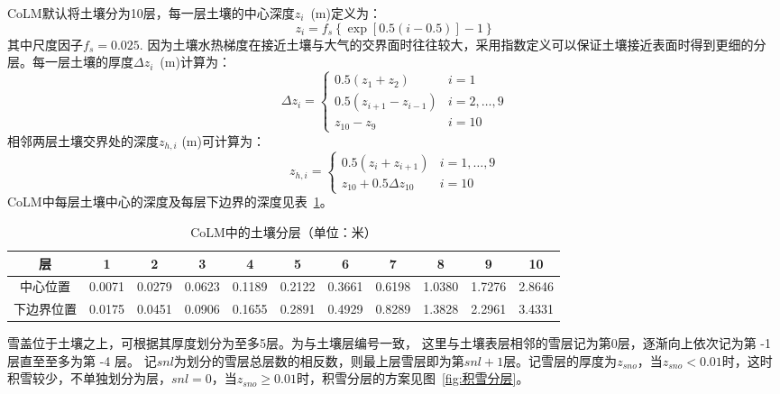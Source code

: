 CoLM默认将土壤分为10层，每一层土壤的中心深度$z_i$~(m)定义为：
\begin{equation}
z_{i} = f_{s}\left\{ \exp{\left\lbrack 0.5(i - 0.5) \right\rbrack} - 1 \right\}
\end{equation}
其中尺度因子$f_s=0.025$. 因为土壤水热梯度在接近土壤与大气的交界面时往往较大，采用指数定义可以保证土壤接近表面时得到更细的分层。每一层土壤的厚度$\Delta z_i$~(m)计算为：
\begin{equation}
\Delta z_{i}=\left\{\begin{array}{ll}0.5\left(z_{1}+z_{2}\right) & i=1 \\
0.5\left(z_{i+1}-z_{i-1}\right) & i=2, \ldots, 9 \\ 
z_{10}-z_{9} & i=10\end{array}\right.
\end{equation}
相邻两层土壤交界处的深度$z_{h,i}$ (m)可计算为：
\begin{equation}
z_{h, i}=\left\{\begin{array}{ll}0.5\left(z_{i}+z_{i+1}\right) & i=1, \ldots, 9 \\
z_{10}+0.5 \Delta z_{10} & i=10\end{array}\right.
\end{equation}
CoLM中每层土壤中心的深度及每层下边界的深度见表~\ref{table:土壤分层}。

\begin{table}[b]
\caption{CoLM中的土壤分层（单位：米）} \label{table:土壤分层}
\centering \renewcommand{\arraystretch}{1.2} \footnotesize
\begin{tabular}{ccccccccccc}
\toprule
层 & 1 & 2 & 3 & 4 & 5 & 6 & 7 & 8 & 9 & 10 \\
\midrule
中心位置 & 0.0071 & 0.0279 & 0.0623 & 0.1189 & 0.2122 & 0.3661 & 0.6198 & 1.0380 & 1.7276 & 2.8646 \\
下边界位置 & 0.0175 & 0.0451 & 0.0906 & 0.1655 & 0.2891 & 0.4929 & 0.8289 & 1.3828 & 2.2961 & 3.4331 \\
\bottomrule
\end{tabular} 
\end{table}


雪盖位于土壤之上，可根据其厚度划分为至多5层。为与土壤层编号一致，
这里与土壤表层相邻的雪层记为第0层，逐渐向上依次记为第 -1 层直至至多为第 -4 层。
记$snl$为划分的雪层总层数的相反数，则最上层雪层即为第$snl+1$层。记雪层的厚度为$z_{sno}$，当$z_{sno}<0.01$时，这时积雪较少，不单独划分为层，$snl=0$，当$z_{sno}\geqslant 0.01$时，积雪分层的方案见图~\ref{fig:积雪分层}。

